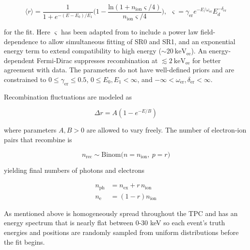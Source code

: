 \begin{equation}
\langle r \rangle = \frac{1}{1 + e^{-(E - E_0) / E_1}}
\bigg( 1 - \frac{\mathrm{ln}(1 + n_{\mathrm{ion}} \varsigma / 4)}{n_{\mathrm{ion}} \varsigma / 4} \bigg)
,\ \ \varsigma = \gamma_{\mathrm{er}} e^{-E / \omega_{\mathrm{er}}} E_d^{-\delta_{\mathrm{er}}}
\label{eq:er_nr_calibrations_parameter_determ_ti}
\end{equation}

\noindent for the fit.  Here $\varsigma$ has been adapted from  to include a power law field-dependence to allow
simultaneous fitting of SR0 and SR1, and an exponential energy term to extend compatibility to high energy
(${\sim} 20\ \mathrm{keV_{ee}}$).  An energy-dependent Fermi-Dirac suppresses recombination at
$\lesssim 2\ \mathrm{keV_{ee}}$ for better agreement with data.  The parameters do not have well-defined priors and are constrained to
$0 \leq \gamma_{\mathrm{er}} \leq 0.5$, $0 \leq E_0, E_1 < \infty$, and
$-\infty < \omega_{\mathrm{er}}, \delta_{\mathrm{er}} < \infty$.

Recombination fluctuations are modeled as

\begin{equation}
\Delta r = A(1 - e^{-E/B})
\label{eq:er_nr_calibrations_parameter_determ_er_rec_fluctuations}
\end{equation}

\noindent where parameters $A,B > 0$ are allowed to vary freely.  The number of electron-ion pairs that recombine is

\begin{equation}
n_{\mathrm{rec}} \sim \mathrm{Binom} \big(n = n_{\mathrm{ion}},\ p = r \big)
\end{equation}

\noindent yielding final numbers of photons and electrons

\begin{subequations}
\begin{align}
n_{\mathrm{ph}} &= n_{\mathrm{ex}} + r\, n_{\mathrm{ion}} \\
n_{\mathrm{e}} &= (1 - r) n_{\mathrm{ion}}
\end{align}
\end{subequations}

\noindent  As mentioned above  is homogeneously spread throughout the TPC and has an energy spectrum that is nearly
flat between 0-30 keV so each event's truth energies and positions are randomly sampled from uniform distributions before the fit begins.




